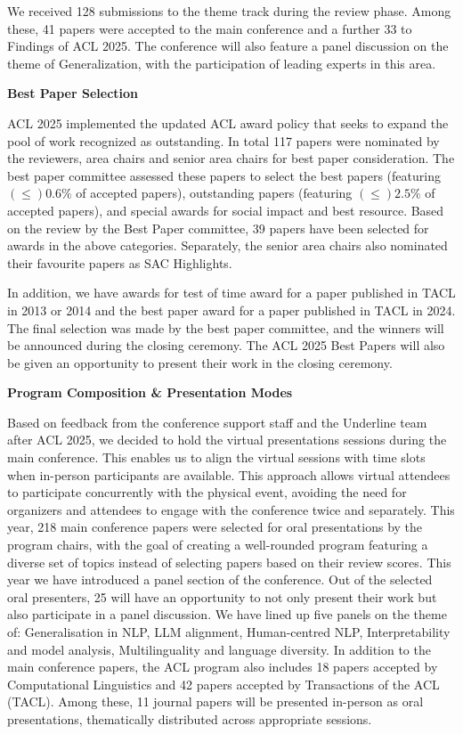 We received 128 submissions to the theme track during the review phase. Among these, 41 papers were accepted to the main conference and a further 33 to Findings of ACL 2025. The conference will also feature a panel discussion on the theme of Generalization, with the participation of leading experts in this area.

\textbf{Best Paper Selection}

ACL 2025 implemented the updated ACL award policy that seeks to expand the pool
of work recognized as outstanding. In total 117 papers were nominated by the reviewers, area chairs and senior area chairs for best paper consideration. The best paper committee assessed these papers to select the best papers (featuring $(\leq)0.6\%$ of accepted papers), outstanding papers (featuring $(\leq)2.5\%$ of accepted papers), and special awards for social impact and best resource.  Based on the review by the Best Paper committee, 39 papers have been selected for awards in the above categories. Separately, the senior area chairs also nominated their favourite papers as SAC Highlights.

In addition, we have awards for test of time award for a paper published in TACL in 2013 or 2014 and the best paper award for a paper published in TACL in 2024. The final selection was made by the best paper committee, and the winners will be announced during the closing ceremony. The ACL 2025 Best Papers will also be given an opportunity to present their work in the closing ceremony.

\textbf{Program Composition \& Presentation Modes}

Based on feedback from the conference support staff and the Underline team after ACL 2025, we decided to hold the virtual presentations sessions during the main conference. This enables us to align the virtual sessions with time slots when in-person participants are available. This approach allows virtual attendees to participate concurrently with the physical event, avoiding the need for organizers and attendees to engage with the conference twice and separately.
This year, 218 main conference papers were selected for oral presentations by the program chairs, with the goal of creating a well-rounded program featuring a diverse set of topics instead of selecting papers based on their review scores. This year we have introduced a panel section of the conference. Out of the selected oral presenters, 25 will have an opportunity to not only present their work but also participate in a panel discussion. We have lined up five panels on the theme of: Generalisation in NLP, LLM alignment, Human-centred NLP, Interpretability and model analysis, Multilinguality and language diversity.
In addition to the main conference papers, the ACL program also includes 18 papers accepted by Computational Linguistics and 42 papers accepted by Transactions of the ACL (TACL). Among these, 11 journal papers will be presented in-person as oral presentations, thematically distributed across appropriate sessions. 

